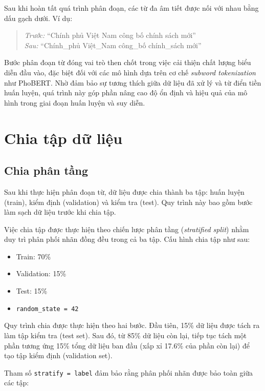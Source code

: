 \documentclass[12pt, a4paper]{report}
\begin{document}
Sau khi hoàn tất quá trình phân đoạn, các từ đa âm tiết được nối với nhau bằng dấu gạch dưới. Ví dụ:

\begin{quote}
\textit{Trước:} ``Chính phủ Việt Nam công bố chính sách mới'' \\
\textit{Sau:} ``Chính\_phủ Việt\_Nam công\_bố chính\_sách mới''
\end{quote}

Bước phân đoạn từ đóng vai trò then chốt trong việc cải thiện chất lượng biểu diễn đầu vào, đặc biệt đối với các mô hình dựa trên cơ chế \textit{subword tokenization} như PhoBERT. Nhờ đảm bảo sự tương thích giữa dữ liệu đã xử lý và từ điển tiền huấn luyện, quá trình này góp phần nâng cao độ ổn định và hiệu quả của mô hình trong giai đoạn huấn luyện và suy diễn.

\section{Chia tập dữ liệu}

\subsection{Chia phân tầng}
\label{sec:data_split}

Sau khi thực hiện phân đoạn từ, dữ liệu được chia thành ba tập: 
huấn luyện (train), kiểm định (validation) và kiểm tra (test). 
Quy trình này bao gồm bước làm sạch dữ liệu trước khi chia tập.

Việc chia tập được thực hiện theo chiến lược phân tầng 
(\textit{stratified split}) nhằm duy trì phân phối nhãn đồng đều 
trong cả ba tập. Cấu hình chia tập như sau:

\begin{itemize}[leftmargin=2em]
  \item Train: 70\%
  \item Validation: 15\%
  \item Test: 15\%
  \item \texttt{random\_state = 42}
\end{itemize}

Quy trình chia được thực hiện theo hai bước. 
Đầu tiên, 15\% dữ liệu được tách ra làm tập kiểm tra (test set). 
Sau đó, từ 85\% dữ liệu còn lại, tiếp tục tách một phần tương ứng 
15\% tổng dữ liệu ban đầu (xấp xỉ 17.6\% của phần còn lại) 
để tạo tập kiểm định (validation set).

Tham số \texttt{stratify = label} đảm bảo rằng phân phối nhãn 
được bảo toàn giữa các tập:
\end{document}
